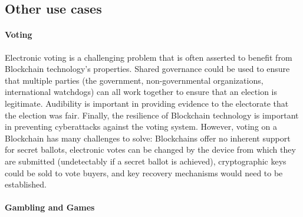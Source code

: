 

\subsection{Other use cases}

\paragraph{Voting}
Electronic voting is a challenging problem that is often asserted to benefit from Blockchain technology's properties.
Shared governance could be used to ensure that multiple parties (the government, non-governmental organizations, international watchdogs) can all work together to ensure that an election is legitimate.
Audibility is important in providing evidence to the electorate that the election was fair.
Finally, the resilience of Blockchain technology is important in preventing cyberattacks against the voting system.
However, voting on a Blockchain has many challenges to solve: Blockchains offer no inherent support for secret ballots, electronic votes can be changed by the device from which they are submitted (undetectably if a secret ballot is achieved), cryptographic keys could be sold to vote buyers, and key recovery mechanisms would need to be established. 

\paragraph{Gambling and Games}

